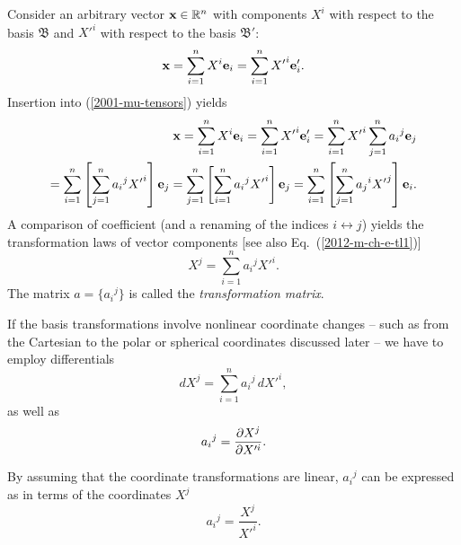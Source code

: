 Consider an arbitrary vector ${\bf x} \in {\Bbb R}^n$
with components $X^i$ with respect to the basis
${\mathfrak B}$
and   ${X'}^i$  with respect to the basis
${\mathfrak B'}$:
\begin{equation}
{\bf x}
=\sum_{i=1}^n X^i {\bf e}_i
=\sum_{i=1}^n {X'}^i {\bf e}'_i
.
\end{equation}
Insertion into (\ref{2001-mu-tensors}) yields
\begin{equation}
\begin{split}
{\bf x}
=\sum_{i=1}^n X^i {\bf e}_i
=\sum_{i=1}^n {X'}^i {\bf e}'_i
=\sum_{i=1}^n {X'}^i \sum_{j=1}^n {a_i}^j {\bf e}_j\\
=
\sum_{i=1}^n\left[\sum_{j=1}^n {a_i}^j{X'}^i \right] {\bf e}_j
=
\sum_{j=1}^n\left[ \sum_{i=1}^n {a_i}^j{X'}^i \right] {\bf e}_j
=
\sum_{i=1}^n\left[ \sum_{j=1}^n {a_j}^i{X'}^j \right] {\bf e}_i
.
\end{split}
\end{equation}
A comparison of coefficient
(and a renaming of the
indices $i \leftrightarrow j$)
yields the transformation laws of vector components
[see also Eq.~(\ref{2012-m-ch-e-tl1})]
\begin{equation}
X^j   = \sum_{i=1}^n {a_i}^j{X'}^i.
\label{2012-m-ch-di-choic}
\end{equation}
The matrix $a=\{{a_i}^j\}$ is called the {\em transformation matrix}.

If the basis transformations involve nonlinear coordinate changes -- such as from the
Cartesian to the polar or spherical coordinates discussed later -- we have to employ differentials
\begin{equation}
dX^j   = \sum_{i=1}^n {a_i}^j \,d{X'}^i  ,
\label{2012-m-ch-di-choic11}
\end{equation}
as well as
\begin{equation}
{a_i}^j ={\partial X^j \over \partial X'^i}   .
\label{2001-mu-tensor-tl11}
\end{equation}

By assuming that the coordinate transformations are linear, ${a_i}^j$ can be expressed as in terms of the coordinates $X^j$
\begin{equation}
{a_i}^j =\frac{  X^j }{  X'^i}  .
\label{2001-mu-tensor-tl1}
\end{equation}

